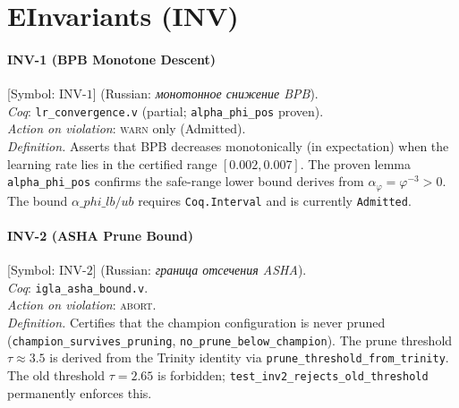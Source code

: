 \bigskip

\section*{E\quad Invariants (INV)}
\label{sec:lexicon-invs}

\paragraph*{\textmd{\textbf{INV-1 (BPB Monotone Descent)}}}
\label{entry:inv1}
[Symbol: $\mathrm{INV}\text{-}1$] (Russian: \textit{монотонное снижение BPB}).\\
\textit{Coq}: \texttt{lr\_convergence.v} (partial; \texttt{alpha\_phi\_pos} proven).\\
\textit{Action on violation}: \textsc{warn} only (Admitted).\\
\textit{Definition.}
Asserts that BPB decreases monotonically (in expectation) when the
learning rate lies in the certified range $[0.002, 0.007]$.
The proven lemma \texttt{alpha\_phi\_pos} confirms the safe-range lower
bound derives from $\alpha_\varphi = \varphi^{-3} > 0$.
The bound $\alpha\_phi\_lb/ub$ requires \texttt{Coq.Interval} and
is currently \texttt{Admitted}.

\paragraph*{\textmd{\textbf{INV-2 (ASHA Prune Bound)}}}
\label{entry:inv2}
[Symbol: $\mathrm{INV}\text{-}2$] (Russian: \textit{граница отсечения ASHA}).\\
\textit{Coq}: \texttt{igla\_asha\_bound.v}.\\
\textit{Action on violation}: \textsc{abort}.\\
\textit{Definition.}
Certifies that the champion configuration is never pruned
(\texttt{champion\_survives\_pruning}, \texttt{no\_prune\_below\_champion}).
The prune threshold $\tau \approx 3.5$ is derived from the Trinity
identity via \texttt{prune\_threshold\_from\_trinity}.
The old threshold $\tau = 2.65$ is forbidden; \texttt{test\_inv2\_rejects\_old\_threshold}
permanently enforces this.

